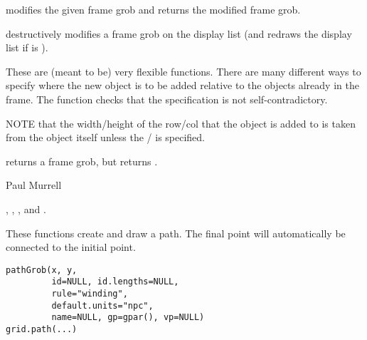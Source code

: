%
\begin{Details}\relax
{} modifies the given frame grob and returns the modified
frame grob.

 destructively modifies a frame grob on the display
list (and redraws the display list if  is ).

These are (meant to be) very flexible functions.  There are many
different
ways to specify where the new object is to be added relative to the
objects already in the frame.  The function checks that the
specification is not self-contradictory.

NOTE that the width/height of the row/col that the object is added to
is taken from the object itself unless the /
is specified.
\end{Details}
%
\begin{Value}
 returns a frame grob, but  returns
.
\end{Value}
%
\begin{Author}\relax
 Paul Murrell 
\end{Author}
%
\begin{SeeAlso}\relax
{},
,
, and .
\end{SeeAlso}
%
\begin{Description}\relax
These functions create and draw a path.
The final point will automatically
be connected to the initial point.
\end{Description}
%
\begin{Usage}
\begin{verbatim}
pathGrob(x, y,
         id=NULL, id.lengths=NULL,
         rule="winding",
         default.units="npc",
         name=NULL, gp=gpar(), vp=NULL)
grid.path(...)
\end{verbatim}
\end{Usage}
%
